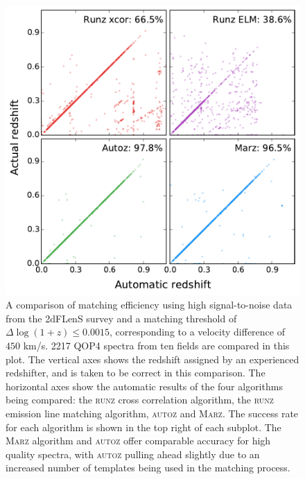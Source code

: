 \documentclass[5p]{elsarticle}
\newcommand{\runz}{\textsc{runz}}
\newcommand{\autoz}{\textsc{autoz}}
\newcommand{\marz}{\textsc{Marz}}
\begin{document}
\begin{figure}[h]
\centering
\includegraphics[width=\columnwidth]{2dfComp.pdf}
\caption{A comparison of matching efficiency using high signal-to-noise data from the 2dFLenS survey and a matching threshold of $\Delta \log(1+z) \leq 0.0015$, corresponding to a velocity difference of  $450$ km/s. 2217 QOP4 spectra from ten fields are compared in this plot. The vertical axes shows the redshift assigned by an experienced redshifter, and is taken to be correct in this comparison. The horizontal axes show the automatic results of the four algorithms being compared: the \runz{} cross correlation algorithm, the \runz{} emission line matching algorithm, \autoz{} and \marz{}. The success rate for each algorithm is shown in the top right of each subplot. The \marz{} algorithm and \autoz{} offer comparable accuracy for high quality spectra, with \autoz{} pulling ahead slightly due to an increased number of templates being used in the matching process.}
\label{fig:high}
\end{figure}
\end{document}
